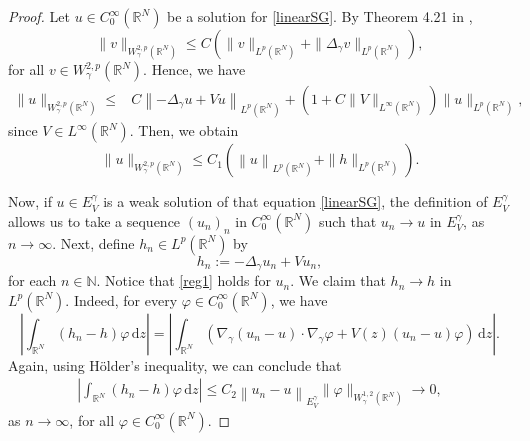 \documentclass[12pt]{amsart}
\newcommand{\R}{\mathbb{R}}
\begin{document}
\begin{proof}
	Let $u \in C_0^{\infty}\left(\R^N\right)$ be a solution for \eqref{linearSG}. By Theorem 4.21 in \cite{Me-N-Spi-20}, 
    $$\|v\|_{W^{2,p}_\gamma(\R^N)} \leq C\left(\|v\|_{L^p(\R^N)} + \| \Delta_\gamma v\|_{L^p(\R^N)}\right) ,$$
    for all $v\in W^{2,p}_\gamma(\R^N)$. Hence, we have
	\begin{align*}
		\|u\|_{W^{2,p}_\gamma(\R^N)}  %
		\leq & C\left\|-\Delta_\gamma u + V u \right\|_{L^p(\R^N)} + (1+C\|V\|_{L^\infty(\R^N)})\|u\|_{L^p(\R^N)} ,
	\end{align*}
    since $V\in L^\infty(\R^N)$. Then, we obtain
	\begin{equation}\label{reg1}
		\|u\|_{W^{2,p}_\gamma(\R^N)}  \leq C_1\left( \left\|u \right\|_{L^p(\R^N)} +  \|h\|_{L^p(\R^N)} \right) .
	\end{equation}


Now, if $u\in E_V^\gamma$ is a weak solution of that equation \eqref{linearSG}, the definition of \(E_V^\gamma\) allows us to take a sequence $(u_n)_{n}$ in $C_0^{\infty}\left(\mathbb{R}^N\right)$ such that $u_n \rightarrow u$ in $E_V^\gamma$, as $n\rightarrow\infty$. Next, define \(h_n \in L^p\left(\mathbb{R}^N\right)\) by
$$
	h_n:=-\Delta_\gamma u_n+V u_n, 
	$$
for each \(n \in \mathbb{N}\). Notice that \eqref{reg1} holds for $u_n$. We claim that $h_n \rightarrow h$ in $L^p\left(\mathbb{R}^N\right)$. Indeed, for every $\varphi \in C_0^\infty\left(\mathbb{R}^N\right)$, we have
\[
\left|\int_{\mathbb{R}^N}\left(h_n-h\right) \varphi \, \mathrm{d}z \right| = \left|\int_{\mathbb{R}^N} \left(\nabla_\gamma\left(u_n-u\right) \cdot \nabla_\gamma \varphi  +  V(z)\left(u_n-u\right) \varphi \right) \, \mathrm{d}z\right|.
\]
Again, using Hölder's inequality, we can conclude that
\begin{equation}\label{distest}
    \begin{aligned}
\left|\int_{\mathbb{R}^N}\left(h_n-h\right) \varphi \, \mathrm{d}z \right| \leq C_2\left\|u_n-u\right\|_{E_V^\gamma} \|\varphi \|_{W^{1, 2}_\gamma(\R^N)} \to 0,
    \end{aligned}
\end{equation}
as $n\rightarrow\infty$, for all $\varphi \in C_0^{\infty}(\mathbb{R}^N)$.


\end{proof}
\end{document}
